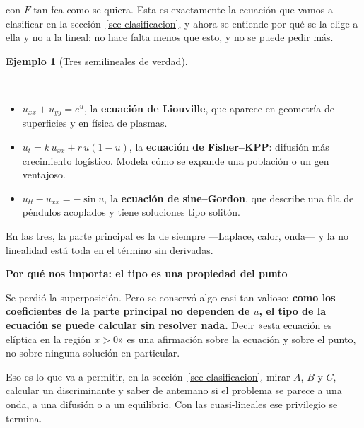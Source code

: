 \documentclass[
  spanish,
  a4paper,
]{scrbook}
\providecommand{\tightlist}{%
  \setlength{\itemsep}{0pt}\setlength{\parskip}{0pt}}
\theoremstyle{definition}
\theoremstyle{plain}
\theoremstyle{definition}
\newtheorem{example}{Ejemplo}[chapter]
\theoremstyle{plain}
\theoremstyle{definition}
\theoremstyle{remark}
\begin{document}
con \(F\) tan fea como se quiera. Esta es exactamente la ecuación que
vamos a clasificar en la sección~\ref{sec-clasificacion}, y ahora se
entiende por qué se la elige a ella y no a la lineal: no hace falta
menos que esto, y no se puede pedir más.

\begin{example}[Tres semilineales de
verdad]\protect\hypertarget{exm-semilineales}{}\label{exm-semilineales}

~

\begin{itemize}
\tightlist
\item
  \(u_{xx} + u_{yy} = e^{u}\), la \textbf{ecuación de Liouville}, que
  aparece en geometría de superficies y en física de plasmas.
\item
  \(u_t = k\,u_{xx} + r\,u(1-u)\), la \textbf{ecuación de Fisher--KPP}:
  difusión más crecimiento logístico. Modela cómo se expande una
  población o un gen ventajoso.
\item
  \(u_{tt} - u_{xx} = -\sin u\), la \textbf{ecuación de sine--Gordon},
  que describe una fila de péndulos acoplados y tiene soluciones tipo
  solitón.
\end{itemize}

En las tres, la parte principal es la de siempre ---Laplace, calor,
onda--- y la no linealidad está toda en el término sin derivadas.

\end{example}

\begin{tcolorbox}[enhanced jigsaw, arc=.35mm, bottomrule=.15mm, breakable, colback=white, colframe=quarto-callout-tip-color-frame, left=2mm, leftrule=.75mm, opacityback=0, rightrule=.15mm, toprule=.15mm]
\begin{minipage}[t]{5.5mm}
\textcolor{quarto-callout-tip-color}{\faLightbulb}
\end{minipage}%
\begin{minipage}[t]{\textwidth - 5.5mm}

\vspace{-3mm}\textbf{Por qué nos importa: el tipo es una propiedad del punto}\vspace{3mm}

Se perdió la superposición. Pero se conservó algo casi tan valioso:
\textbf{como los coeficientes de la parte principal no dependen de
\(u\), el tipo de la ecuación se puede calcular sin resolver nada.}
Decir «esta ecuación es elíptica en la región \(x>0\)» es una afirmación
sobre la ecuación y sobre el punto, no sobre ninguna solución en
particular.

Eso es lo que va a permitir, en la sección~\ref{sec-clasificacion},
mirar \(A\), \(B\) y \(C\), calcular un discriminante y saber de
antemano si el problema se parece a una onda, a una difusión o a un
equilibrio. Con las cuasi-lineales ese privilegio se termina.

\end{minipage}%
\end{tcolorbox}
\end{document}
